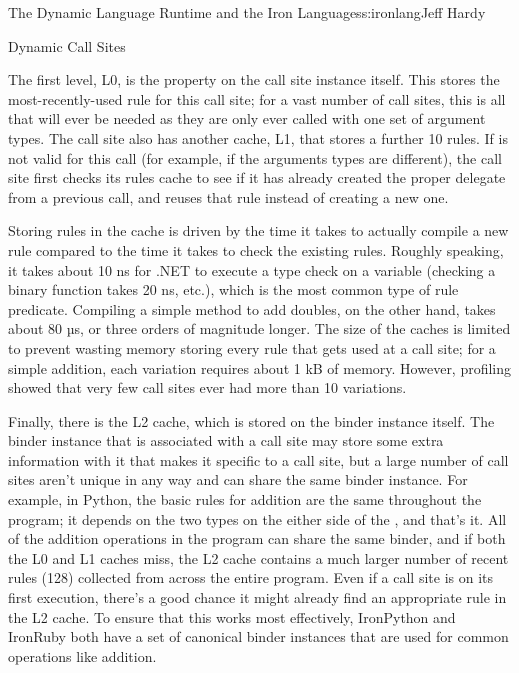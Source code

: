 \begin{aosachapter}{The Dynamic Language Runtime and the Iron Languages}{s:ironlang}{Jeff Hardy}
\begin{aosasect1}{Dynamic Call Sites}

The first level, L0, is the  property on the call site instance itself. This stores the most-recently-used rule for this call site; for a vast number of call sites, this is all that will ever be needed as they are only ever called with one set of argument types. The call site also has another cache, L1, that stores a further 10 rules. If  is not valid for this call (for example, if the arguments types are different), the call site first checks its rules cache to see if it has already created the proper delegate from a previous call, and reuses that rule instead of creating a new one.

Storing rules in the cache is driven by the time it takes to actually compile a new rule compared to the time it takes to check the existing rules. Roughly speaking, it takes about 10 ns for .NET to execute a type check on a variable (checking a binary function takes 20 ns, etc.), which is the most common type of rule predicate. Compiling a simple method to add doubles, on the other hand, takes about 80 µs, or three orders of magnitude longer. The size of the caches is limited to prevent wasting memory storing every rule that gets used at a call site; for a simple addition, each variation requires about 1 kB of memory. However, profiling showed that very few call sites ever had more than 10 variations.

Finally, there is the L2 cache, which is stored on the binder instance itself. The binder instance that is associated with a call site may store some extra information with it that makes it specific to a call site, but a large number of call sites aren't unique in any way and can share the same binder instance. For example, in Python, the basic rules for addition are the same throughout the program; it depends on the two types on the either side of the \code{+}, and that's it. All of the addition operations in the program can share the same binder, and if both the L0 and L1 caches miss, the L2 cache contains a much larger number of recent rules (128) collected from across the entire program. Even if a call site is on its first execution, there's a good chance it might already find an appropriate rule in the L2 cache. To ensure that this works most effectively, IronPython and IronRuby both have a set of canonical binder instances that are used for common operations like addition.


\end{aosasect1}
\end{aosachapter}
